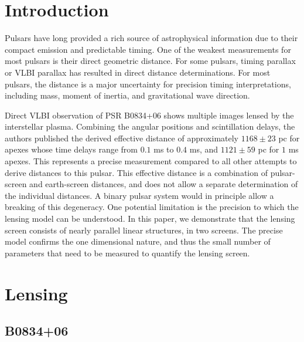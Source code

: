 \documentclass{emulateapj}
\begin{document}
\newcommand{\be}{\begin{eqnarray}}
\newcommand{\ee}{\end{eqnarray}}
\newcommand{\beq}{\begin{equation}}
\newcommand{\eeq}{\end{equation}}

\section{Introduction}

Pulsars have long provided a rich source of astrophysical information
due to their compact emission and predictable timing.   One of the
weakest measurements for most pulsars is their direct geometric
distance.  For some pulsars, timing parallax or VLBI parallax has
resulted in direct distance determinations.  For most pulsars, the
distance is a major uncertainty for precision timing interpretations,
including mass, moment of inertia, and gravitational wave
direction\citep{boyle2012}.

Direct VLBI observation of PSR B0834+06 shows multiple images lensed
by the interstellar plasma.  Combining the angular positions and
scintillation delays, the authors published the derived effective
distance \citep{2010ApJ...708..232B} of approximately $1168\pm 23$ pc
for apexes whose time delays range from $0.1$ ms to $0.4$ ms, and
$1121\pm 59$ pc for $1$ ms apexes.  This represents a precise
measurement compared to all other attempts to derive distances to this
pulsar.  This effective distance is a combination of pulsar-screen and
earth-screen distances, and does not allow a separate determination of
the individual distances.  A binary pulsar system would in principle
allow a breaking of this degeneracy\citep{2014MNRAS.442.3338P}. One
potential limitation is the precision to which the lensing model can
be understood.  In this paper, we demonstrate that the lensing screen
consists of nearly parallel linear structures, in two screens.  The
precise model confirms the one dimensional nature, and thus the small
number of parameters that need to be measured to quantify the lensing screen. 

\section{Lensing}
\subsection{B0834+06}
\end{document}
